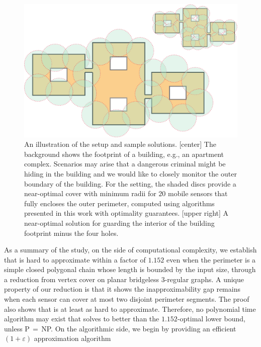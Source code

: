 \begin{figure}[ht]
    \centering
		\vspace*{2mm}
    \includegraphics[width=\columnwidth]{chapters/osg/figures/example-0-eps-converted-to.pdf}
		\vspace*{1mm}
    \caption{An illustration of the \osgt setup and sample solutions.
		[center] The background shows the footprint of a building, e.g., an 
		apartment  complex. Scenarios may arise that a dangerous criminal 
		might be hiding in the building and we would like to closely monitor 
		the outer boundary of the building.	For the setting, the shaded 
		discs provide a	near-optimal cover with minimum radii for $20$ 
		mobile sensors that fully encloses the outer perimeter, computed 
		using algorithms presented in this work with optimality guarantees. 
		[upper right] A near-optimal solution for guarding the interior of
		the building footprint minus the four holes.}
    \label{fig:example0}
\end{figure}
As a summary of the study, on the side of computational complexity, we 
establish that \opgt is hard to approximate within a factor of 
$1.152$
even when the perimeter is a simple closed polygonal chain whose length
is bounded by the input size, through a reduction from 
vertex cover on planar bridgeless $3$-regular graphs.
%
A unique property of our reduction is that it shows the inapproximability gap
remains when each sensor can cover at most two disjoint perimeter 
segments. 
%
The proof also shows that \orgt is at least as hard to approximate. 
Therefore, no polynomial time algorithm may exist that solves \osgt to 
better than the $1.152$-optimal lower bound, unless P$\,=\,$NP. 
%
On the algorithmic side, we begin by providing an efficient $(1+\varepsilon)$
approximation algorithm

